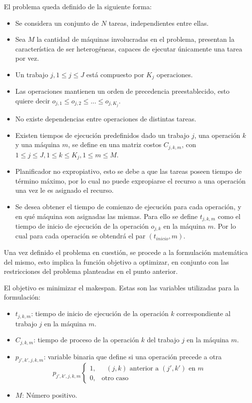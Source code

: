 \documentclass[journal]{IEEEtran}
\begin{document}
	El problema queda definido de la siguiente forma:
\begin{itemize}
  \item Se considera un conjunto de $N$ tareas, independientes entre ellas.
  \item Sea $M$ la cantidad de máquinas involucradas en el problema, presentan la característica de ser heterogéneas, capaces de ejecutar únicamente una tarea por vez.
  \item Un trabajo $j, 1\leq j \leq J$  está compuesto por $K_{j}$ operaciones.
  \item Las operaciones mantienen un orden de precedencia preestablecido, esto quiere decir $o_{j,1}\le o_{j,2} \le ... \le o_{j,K_{j}}$.
  \item No existe dependencias entre operaciones de distintas tareas.
  \item Existen tiempos de ejecución predefinidos dado un trabajo $j$, una operación $k$ y una máquina $m$, se define en una matriz costos $C_{j,k,m}$, con $1\leq j \leq J, 1\leq k \leq K_{j}, 1\leq m \leq M$.
  \item Planificador no expropiativo, esto se debe a que las tareas poseen tiempo de término máximo, por lo cual no puede expropiarse el recurso a una operación una vez le es asignado el recurso.
  \item Se desea obtener el tiempo de comienzo de ejecución para cada operación, y en qué máquina son asignadas las mismas. Para ello se define $t_{j,k,m}$ como el tiempo de inicio de ejecución de la operación $o_{j,k}$ en la máquina $m$. Por lo cual para cada operación se obtendrá el par $(t_{inicio}, m)$.
\end{itemize}

Una vez definido el problema en cuestión, se procede a la formulación matemática del mismo, esto implica la función objetivo a optimizar, en conjunto con las restricciones del problema planteadas en el punto anterior.

El objetivo es minimizar el makespan. Estas son las variables utilizadas para la formulación:
\begin{itemize}
  \item $t_{j,k,m}$: tiempo de inicio de ejecución de la operación $k$ correspondiente al trabajo $j$ en la máquina $m$.
  \item $C_{j,k,m}$: tiempo de proceso de la operación $k$ del trabajo $j$ en la máquina $m$.
  \item $p_{j',k',j,k,m}$: variable binaria que define si una operación precede a otra \[
p_{j',k',j,k,m}
\begin{cases}
    1,& \text{ $(j,k)$ anterior a $(j',k')$ en $m$ } \\
    0,              & \text{otro caso}
\end{cases}
\]

\item $M$: Número positivo.
\end{itemize}
\end{document}
